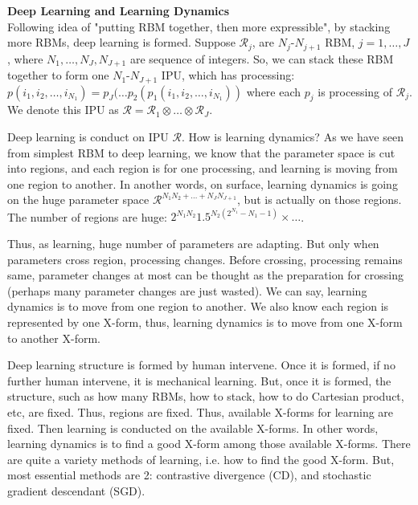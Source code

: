 {\bf Deep Learning and Learning Dynamics} \\
Following idea of "putting RBM together, then more expressible", by stacking more RBMs, deep learning is formed. Suppose $\mathcal{R}_j$, are $N_j$-$N_{j+1}$ RBM, $j = 1, \ldots, J$, where $N_1, \ldots, N_J, N_{J+1}$ are sequence of integers.  So, we can stack these RBM together to form one $N_1$-$N_{J+1}$ IPU, which has processing: $p(i_1, i_2, \ldots, i_{N_1}) = p_J ( \ldots  p_2 ( p_1(i_1, i_2, \ldots, i_{N_1}) )$
where each $p_j$ is processing of $\mathcal{R}_j$. We denote this IPU as $\mathcal{R} =  \mathcal{R}_1 \otimes \ldots \otimes \mathcal{R}_J$. 


Deep learning is conduct on IPU $\mathcal{R}$. How is learning dynamics? As we have seen from simplest RBM to deep learning, we know that the parameter space is cut into regions, and each region is for one processing, and learning is moving from one region to another. In another words, on surface, learning dynamics is going on the huge parameter space $\mathcal{R}^{N_1N_2 + \ldots + N_JN_{J+1}}$, but is actually on those regions. The number of regions are huge: $2^{N_1N_2} 1.5^{N_2(2^{N_1}-N_1-1)} \times \ldots$. 

Thus, as learning, huge number of parameters are adapting. But only when parameters cross region, processing changes. Before crossing, processing remains same, parameter changes at most can be thought as the preparation for crossing (perhaps many parameter changes are just wasted). We can say, learning dynamics is to move from one region to another. We also know each region is represented by one X-form, thus, learning dynamics is to move from one X-form to another X-form. 


Deep learning structure is formed by human intervene. Once it is formed, if no further human intervene, it is mechanical learning. But, once it is formed, the structure, such as how many RBMs, how to stack, how to do Cartesian product, etc, are fixed. Thus, regions are fixed. Thus, available X-forms for learning are fixed. Then learning is conducted on the available X-forms. In other words, learning dynamics is to find a good X-form among those available X-forms. There are quite a variety methods of learning, i.e. how to find the good X-form. But, most essential methods are 2: contrastive divergence (CD), and stochastic gradient descendant (SGD). 


